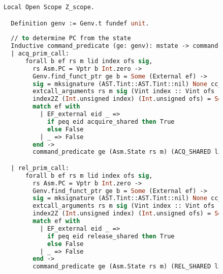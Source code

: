 \begin{figure}

\begin{lstlisting}[language=Caml]
  Local Open Scope Z_scope.

  Definition genv := Genv.t fundef unit.
    
  // to determine PC from the state 
  Inductive command_predicate (ge: genv): mstate -> command -> Prop :=
  | acq_prim_call:
      forall b ef rs m lid index ofs sig,
        rs Asm.PC = Vptr b Int.zero ->
        Genv.find_funct_ptr ge b = Some (External ef) ->
        sig = mksignature (AST.Tint::AST.Tint::nil) None cc_default ->
        extcall_arguments rs m sig (Vint index :: Vint ofs :: nil) ->
        index2Z (Int.unsigned index) (Int.unsigned ofs) = Some lid ->
        match ef with
          | EF_external eid _ => 
            if peq eid acquire_shared then True
            else False
          | _ => False
        end ->
        command_predicate ge (Asm.State rs m) (ACQ_SHARED lid)

  | rel_prim_call:
      forall b ef rs m lid index ofs sig,
        rs Asm.PC = Vptr b Int.zero ->
        Genv.find_funct_ptr ge b = Some (External ef) ->
        sig = mksignature (AST.Tint::AST.Tint::nil) None cc_default ->
        extcall_arguments rs m sig (Vint index :: Vint ofs :: nil) ->
        index2Z (Int.unsigned index) (Int.unsigned ofs) = Some lid ->
        match ef with
          | EF_external eid _ => 
            if peq eid release_shared then True
            else False
          | _ => False
        end ->
        command_predicate ge (Asm.State rs m) (REL_SHARED lid)
\end{lstlisting}
\end{figure}

